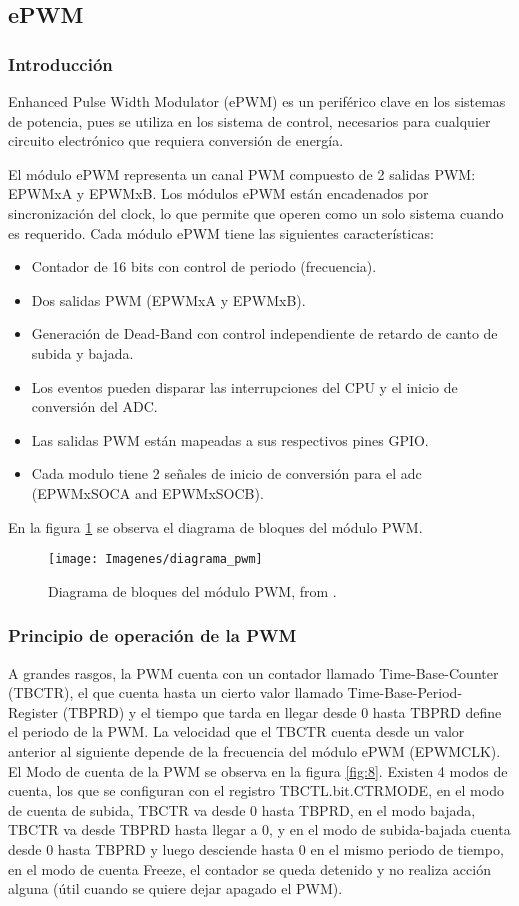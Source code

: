 \subsection{ePWM}
\subsubsection{Introducción}


Enhanced Pulse Width Modulator (ePWM) es un periférico clave en los sistemas de potencia, pues se utiliza en los sistema de control, necesarios para cualquier circuito electrónico que requiera conversión de energía.

El módulo ePWM representa un canal PWM compuesto de 2 salidas PWM: EPWMxA y EPWMxB.
Los módulos ePWM están encadenados por sincronización del clock, lo que permite que operen como un solo sistema cuando es requerido. Cada módulo ePWM tiene las siguientes características:
\begin{itemize}
	\item Contador de 16 bits con control de periodo (frecuencia).
	\item Dos salidas PWM (EPWMxA y EPWMxB).
	\item Generación de Dead-Band con control independiente de retardo de canto de subida y bajada.
	\item Los eventos pueden disparar las interrupciones del CPU y el inicio de conversión del ADC.
	\item Las salidas PWM están mapeadas a sus respectivos pines GPIO.
	\item Cada modulo tiene 2 señales de inicio de conversión para el adc (EPWMxSOCA and EPWMxSOCB).
\end{itemize}

En la figura \ref{fig:7} se observa el diagrama de bloques del módulo PWM.

\begin{figure}[H]
	\centering
	\texttt{[image: Imagenes/diagrama\_pwm]}
	\caption{Diagrama de bloques del módulo PWM, from \cite[page 1865]{tmr}.}
	\label{fig:7}
\end{figure}

\subsubsection{Principio de operación de la PWM}
A grandes rasgos, la PWM cuenta con un contador llamado Time-Base-Counter (TBCTR), el que cuenta hasta un cierto valor llamado Time-Base-Period-Register (TBPRD) y el tiempo que tarda en llegar desde 0 hasta TBPRD define el periodo de la PWM. La velocidad que el TBCTR cuenta desde un valor anterior al siguiente depende de la frecuencia del módulo ePWM (EPWMCLK). El Modo de cuenta de la PWM se observa en la figura \ref{fig:8}. Existen 4 modos de cuenta, los que se configuran con el registro TBCTL.bit.CTRMODE, en el modo de cuenta de subida, TBCTR va desde 0 hasta TBPRD, en el modo bajada, TBCTR va desde TBPRD hasta llegar a 0, y en el modo de subida-bajada cuenta desde 0 hasta TBPRD y luego desciende hasta 0 en el mismo periodo de tiempo, en el modo de cuenta Freeze, el contador se queda detenido y no realiza acción alguna (útil cuando se quiere dejar apagado el PWM).

